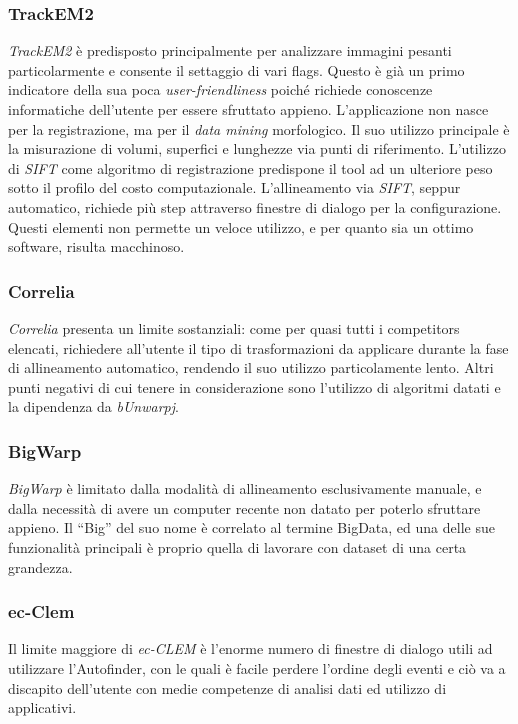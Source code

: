 \subsubsection{TrackEM2}
\textit{TrackEM2} è predisposto principalmente per analizzare immagini pesanti particolarmente e consente il settaggio di vari flags.
Questo è già un primo indicatore della sua poca \textit{user-friendliness} poiché richiede conoscenze informatiche dell'utente per essere sfruttato appieno. L'applicazione non nasce per la registrazione, ma per il \textit{data mining} morfologico. Il suo utilizzo principale è la misurazione di volumi, superfici e lunghezze via punti di riferimento. L'utilizzo di \textit{SIFT} come algoritmo di registrazione predispone il tool ad un ulteriore peso sotto il profilo del costo computazionale. L'allineamento via \textit{SIFT}, seppur automatico, richiede più step attraverso finestre di dialogo per la configurazione. Questi elementi non permette un veloce utilizzo, e per quanto sia un ottimo software, risulta macchinoso.

\subsubsection{Correlia}
\textit{Correlia} presenta un limite sostanziali: come per quasi tutti i competitors elencati, richiedere all'utente il tipo di trasformazioni da applicare durante la fase di allineamento automatico, rendendo il suo utilizzo particolamente lento. Altri punti negativi di cui tenere in considerazione sono l'utilizzo di algoritmi datati e la dipendenza da \textit{bUnwarpj}.

\subsubsection{BigWarp}
\textit{BigWarp} è limitato dalla modalità di allineamento esclusivamente manuale, e dalla necessità di avere un computer recente non datato per poterlo sfruttare appieno. Il ``Big'' del suo nome è correlato al termine BigData, ed una delle sue funzionalità principali è proprio quella di lavorare con dataset di una certa grandezza.

\subsubsection{ec-Clem}
Il limite maggiore di \textit{ec-CLEM} è l'enorme numero di finestre di dialogo utili ad utilizzare l'Autofinder, con le quali è facile perdere l'ordine degli eventi e ciò va a discapito dell'utente con medie competenze di analisi dati ed utilizzo di applicativi.